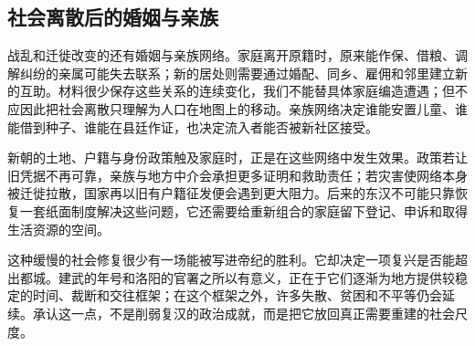 \subsection{社会离散后的婚姻与亲族}

战乱和迁徙改变的还有婚姻与亲族网络。家庭离开原籍时，原来能作保、借粮、调解纠纷的亲属可能失去联系；新的居处则需要通过婚配、同乡、雇佣和邻里建立新的互助。材料很少保存这些关系的连续变化，我们不能替具体家庭编造遭遇；但不应因此把社会离散只理解为人口在地图上的移动。亲族网络决定谁能安置儿童、谁能借到种子、谁能在县廷作证，也决定流入者能否被新社区接受。

新朝的土地、户籍与身份政策触及家庭时，正是在这些网络中发生效果。政策若让旧凭据不再可靠，亲族与地方中介会承担更多证明和救助责任；若灾害使网络本身被迁徙拉散，国家再以旧有户籍征发便会遇到更大阻力。后来的东汉不可能只靠恢复一套纸面制度解决这些问题，它还需要给重新组合的家庭留下登记、申诉和取得生活资源的空间。

这种缓慢的社会修复很少有一场能被写进帝纪的胜利。它却决定一项复兴是否能超出都城。建武的年号和洛阳的官署之所以有意义，正在于它们逐渐为地方提供较稳定的时间、裁断和交往框架；在这个框架之外，许多失散、贫困和不平等仍会延续。承认这一点，不是削弱复汉的政治成就，而是把它放回真正需要重建的社会尺度。

